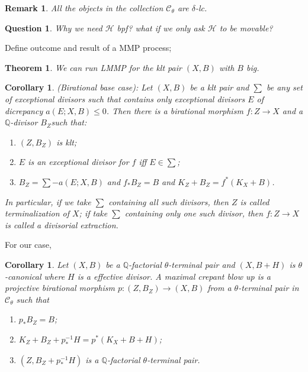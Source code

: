 \documentclass{article}
\newtheorem{thm}[defn]{Theorem}
\newtheorem{cor}[defn]{Corollary}
\newtheorem{rmk}[defn]{Remark}
\newtheorem*{ques}{Question}
\begin{document}
\begin{rmk}
  All the objects in the collection $ \mathcal{C}_\theta $ are $ \delta $-lc.
\end{rmk}

\begin{ques}
  Why we need $ \mathcal{H} $ bpf? what if we only ask $ \mathcal{H} $ to be movable?
\end{ques}

Define outcome and result of a MMP process;
\begin{thm}\label{BCHM}
  We can run LMMP for the klt pair $ (X,B) $ with $ B $ big.
\end{thm}
\begin{cor}\label{extraction}
  (Birational base case): Let $ (X,B) $ be a klt pair and $ \sum $ be any set of exceptional divisors such that  contains only exceptional divisors $ E $ of dicrepancy $ a(E;X,B)\leqslant 0 $. Then there is a birational morphism $ f:Z\to X $ and a $ \mathbb{Q} $-divisor $ B_Z $such that:
  \begin{enumerate}
    \item $ (Z,B_Z) $ is klt;
    \item $ E $ is an exceptional divisor for $ f $ iff $ E\in\sum $;
    \item $ B_Z=\sum-a(E;X,B) $ and $ f_*B_Z=B $ and $ K_Z+B_Z=f^*(K_X+B) $.
  \end{enumerate} 
  In particular, if we take $ \sum $ containing all such divisors, then $ Z $ is called \textit{terminalization} of $ X $; if take $ \sum $ containing only one such divisor, then $ f:Z\to X $ is called a \textit{divisorial extraction}.    

\end{cor}

For our case,
\begin{cor}
  Let $ (X,B) $ be a $ \mathbb{Q} $-factorial $ \theta $-terminal pair and $ (X,B+H) $ is $ \theta $-canonical where $ H$ is a effective divisor. A \textit{maximal crepant blow up} is a projective birational morphism $ p:(Z,B_Z)\to (X,B) $ from a $ \theta $-terminal pair in $ \mathcal{C}_\theta $ such that
  \begin{enumerate}
    \item $ p_*B_Z=B $;
    \item $ K_Z+B_Z+p^{-1}_*H=p^*(K_X+B+H) $;
    \item $ (Z,B_Z+p^{-1}_*H) $ is a $ \mathbb{Q} $-factorial $\theta $-terminal pair.
  \end{enumerate}  
\end{cor}
\end{document}
